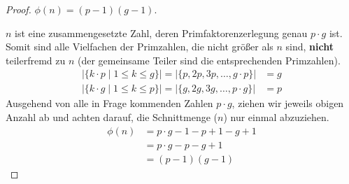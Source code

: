 \begin{proof}
    $\phi(n) = (p - 1)(g - 1)$.

    $n$ ist eine zusammengesetzte Zahl, deren Primfaktorenzerlegung 
    genau $p \cdot g$ ist. Somit sind alle Vielfachen der Primzahlen, die
    nicht größer als $n$ sind, \textbf{nicht} teilerfremd zu $n$ (der gemeinsame Teiler
    sind die entsprechenden Primzahlen). 
    \begin{align*}
        \vert 
        \{
            k\cdot p \mid 1 \leq k \leq g 
        \} \vert = \vert \{
            p, 2p, 3p, \dots, g\cdot p
        \}\vert &= g\\
        \vert
        \{
            k\cdot g \mid 1 \leq k \leq p 
        \} \vert = \vert \{
            g, 2g, 3g, \dots, p\cdot g
        \}\vert &= p
    \end{align*}
    Ausgehend von alle in Frage kommenden Zahlen $p\cdot g$, ziehen wir
    jeweils obigen Anzahl ab und achten darauf, die Schnittmenge ($n$) nur einmal
    abzuziehen.
    \begin{align*}
            \phi(n) &= p\cdot g - 1 - p + 1 - g + 1\\
            &= p\cdot g - p - g + 1\\
            &= (p - 1) (g - 1)
    \end{align*}
\end{proof}